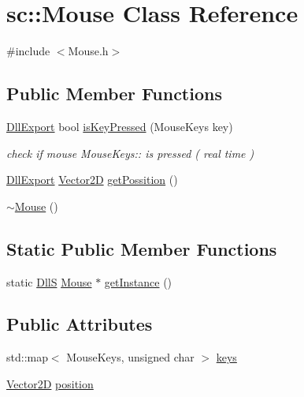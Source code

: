 \hypertarget{classsc_1_1_mouse}{}\section{sc\+::Mouse Class Reference}
\label{classsc_1_1_mouse}


{\ttfamily \#include $<$Mouse.\+h$>$}

\subsection*{Public Member Functions}
\begin{DoxyCompactItemize}
\item 
\mbox{\hyperlink{_vector2_d_8h_af83a0ad9d707a0bc5fe281b6e5c358a1}{Dll\+Export}} bool \mbox{\hyperlink{classsc_1_1_mouse_a55f4069da03cdd14d64c83d668945e9c}{is\+Key\+Pressed}} (Mouse\+Keys key)
\begin{DoxyCompactList}\small\item\em check if mouse Mouse\+Keys\+:\+: is pressed ( real time ) \end{DoxyCompactList}\item 
\mbox{\hyperlink{_vector2_d_8h_af83a0ad9d707a0bc5fe281b6e5c358a1}{Dll\+Export}} \mbox{\hyperlink{classsc_1_1_vector2_d}{Vector2D}} \mbox{\hyperlink{classsc_1_1_mouse_ae71bc5e3211e2ba9935e703cc04e7492}{get\+Possition}} ()
\item 
\mbox{\hyperlink{classsc_1_1_mouse_afdf7d8abef29c10be77ead773f964f4f}{$\sim$\+Mouse}} ()
\end{DoxyCompactItemize}
\subsection*{Static Public Member Functions}
\begin{DoxyCompactItemize}
\item 
static \mbox{\hyperlink{_single_test_8h_ac612533c84ec9f58274935ca41422bc2}{DllS}} \mbox{\hyperlink{classsc_1_1_mouse}{Mouse}} $\ast$ \mbox{\hyperlink{classsc_1_1_mouse_ab5cf94940a8ab2dad32bf298abf69b2d}{get\+Instance}} ()
\end{DoxyCompactItemize}
\subsection*{Public Attributes}
\begin{DoxyCompactItemize}
\item 
std\+::map$<$ Mouse\+Keys, unsigned char $>$ \mbox{\hyperlink{classsc_1_1_mouse_a9389587000931c81c45eef82921f8491}{keys}}
\item 
\mbox{\hyperlink{classsc_1_1_vector2_d}{Vector2D}} \mbox{\hyperlink{classsc_1_1_mouse_a6148d8e9f122e83d0024ab77523a1e49}{position}}
\end{DoxyCompactItemize}
